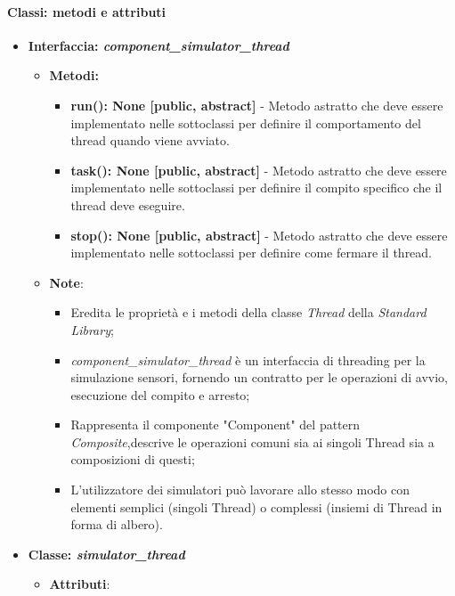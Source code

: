 \paragraph{Classi: metodi e attributi}

\begin{itemize}
    \item{\textbf{Interfaccia: \textit{component\_simulator\_thread}}}
    \begin{itemize}
        \item \textbf{Metodi: }
        \begin{itemize}
            \item \textbf{run(): None [public, abstract]} - Metodo astratto che deve essere implementato nelle sottoclassi per definire il comportamento del thread quando viene avviato.
            \item \textbf{task(): None [public, abstract]} - Metodo astratto che deve essere implementato nelle sottoclassi per definire il compito specifico che il thread deve eseguire.
            \item \textbf{stop(): None [public, abstract]} - Metodo astratto che deve essere implementato nelle sottoclassi per definire come fermare il thread.
        \end{itemize}
        \item\textbf{Note}:
        \begin{itemize}
            \item Eredita le proprietà e i metodi della classe \textit{Thread} della \textit{Standard Library};
            \item \textit{component\_simulator\_thread} è un interfaccia di threading per la simulazione sensori, fornendo un contratto per le operazioni di avvio, esecuzione del compito e arresto;
            \item Rappresenta il componente "Component" del pattern \textit{Composite},descrive le operazioni comuni sia ai singoli Thread sia a composizioni di questi;
            \item L'utilizzatore dei simulatori può lavorare allo stesso modo con elementi semplici (singoli Thread) o complessi (insiemi di Thread in forma di albero).
        \end{itemize}
    \end{itemize}
    \item{\textbf{Classe: \textit{simulator\_thread}}}
    \begin{itemize}
        \item\textbf{Attributi}:

\end{itemize}
\end{itemize}
